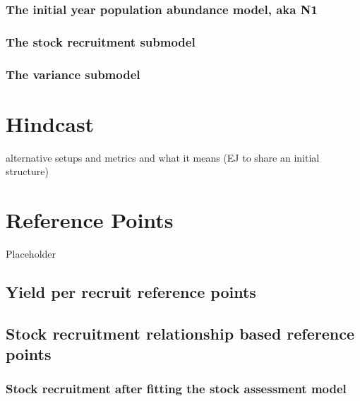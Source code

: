 \documentclass[
]{book}
\begin{document}
\hypertarget{the-initial-year-population-abundance-model-aka-n1}{%
\subsection{The initial year population abundance model, aka N1}\label{the-initial-year-population-abundance-model-aka-n1}}

\hypertarget{the-stock-recruitment-submodel}{%
\subsection{The stock recruitment submodel}\label{the-stock-recruitment-submodel}}

\hypertarget{the-variance-submodel}{%
\subsection{The variance submodel}\label{the-variance-submodel}}

\hypertarget{hindcast}{%
\chapter{Hindcast}\label{hindcast}}

alternative setups and metrics and what it means (EJ to share an initial structure)

\hypertarget{reference-points}{%
\chapter{Reference Points}\label{reference-points}}

Placeholder

\hypertarget{yield-per-recruit-reference-points}{%
\section{Yield per recruit reference points}\label{yield-per-recruit-reference-points}}

\hypertarget{stock-recruitment-relationship-based-reference-points}{%
\section{Stock recruitment relationship based reference points}\label{stock-recruitment-relationship-based-reference-points}}

\hypertarget{stock-recruitment-after-fitting-the-stock-assessment-model}{%
\subsection{Stock recruitment after fitting the stock assessment model}\label{stock-recruitment-after-fitting-the-stock-assessment-model}}
\end{document}
